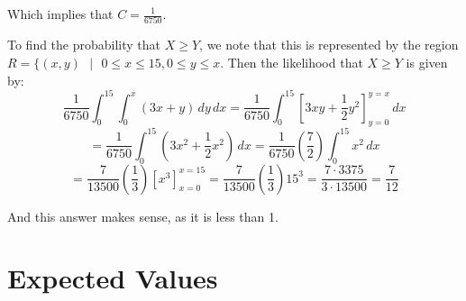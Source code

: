 Which implies that $C = \frac{1}{6750}$.

To find the probability that $X \geq Y$, we note that this is represented by 
the region $R = \{(x, y)\text{ }|\text{ }0 \leq x \leq 15, 0 \leq y \leq x$. 
Then the likelihood that $X \geq Y$ is given by:
$$\frac{1}{6750} \int_0^{15} \int_0^x \left( 3x + y \right) \,dy\,dx = \frac{
1}{6750} \int_0^{15} \left[ 3xy + \frac{1}{2}y^2 \right]_{y = 0}^{y = x}\,dx$$
$$= \frac{1}{6750} \int_0^{15} \left(3x^2 + \frac{1}{2}x^2 \right)\,dx = \frac{
1}{6750} \left( \frac{7}{2} \right) \int_0^{15} x^2\,dx$$
$$= \frac{7}{13500} \left( \frac{1}{3} \right) \left[x^3 \right]_{x = 0}^{x = 
15} = \frac{7}{13500} \left( \frac{1}{3} \right) 15^3 = \frac{7 \cdot 3375}{3 
\cdot 13500} = \frac{7}{12}$$

And this answer makes sense, as it is less than 1. 

\section{Expected Values}
